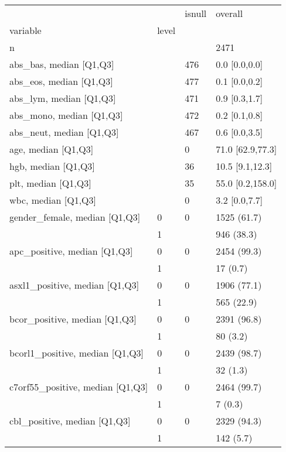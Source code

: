 \begin{tabular}{llll}
\toprule
                 &    & isnull &           overall \\
variable & level &        &                   \\
\midrule
n &    &        &              2471 \\
abs\_bas, median [Q1,Q3] &    &    476 &     0.0 [0.0,0.0] \\
abs\_eos, median [Q1,Q3] &    &    477 &     0.1 [0.0,0.2] \\
abs\_lym, median [Q1,Q3] &    &    471 &     0.9 [0.3,1.7] \\
abs\_mono, median [Q1,Q3] &    &    472 &     0.2 [0.1,0.8] \\
abs\_neut, median [Q1,Q3] &    &    467 &     0.6 [0.0,3.5] \\
age, median [Q1,Q3] &    &      0 &  71.0 [62.9,77.3] \\
hgb, median [Q1,Q3] &    &     36 &   10.5 [9.1,12.3] \\
plt, median [Q1,Q3] &    &     35 &  55.0 [0.2,158.0] \\
wbc, median [Q1,Q3] &    &      0 &     3.2 [0.0,7.7] \\
gender\_female, median [Q1,Q3] & 0 &      0 &       1525 (61.7) \\
                 & 1 &        &        946 (38.3) \\
apc\_positive, median [Q1,Q3] & 0 &      0 &       2454 (99.3) \\
                 & 1 &        &          17 (0.7) \\
asxl1\_positive, median [Q1,Q3] & 0 &      0 &       1906 (77.1) \\
                 & 1 &        &        565 (22.9) \\
bcor\_positive, median [Q1,Q3] & 0 &      0 &       2391 (96.8) \\
                 & 1 &        &          80 (3.2) \\
bcorl1\_positive, median [Q1,Q3] & 0 &      0 &       2439 (98.7) \\
                 & 1 &        &          32 (1.3) \\
c7orf55\_positive, median [Q1,Q3] & 0 &      0 &       2464 (99.7) \\
                 & 1 &        &           7 (0.3) \\
cbl\_positive, median [Q1,Q3] & 0 &      0 &       2329 (94.3) \\
                 & 1 &        &         142 (5.7) \\

\end{tabular}
